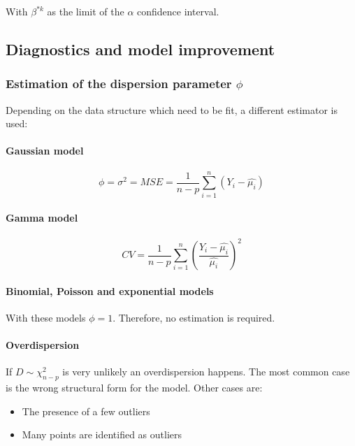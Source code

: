 With $\beta^{*k}$ as the limit of the $\alpha$ confidence interval.

\subsection{Diagnostics and model improvement}

\subsubsection{Estimation of the dispersion parameter $\phi$}

Depending on the data structure which need to be fit, a different estimator is used:

\paragraph{Gaussian model}
\begin{equation*}
\phi = \sigma^2 = MSE = \frac{1}{n-p}\sum_{i=1}^{n}(Y_i - \hat{\mu_i})
\end{equation*}

\paragraph{Gamma model}
\begin{equation*}
CV = \frac{1}{n-p}\sum_{i=1}^{n}\left(\frac{Y_i-\hat{\mu_i}}{\hat{\mu_i}}\right)^2
\end{equation*}

\paragraph{Binomial, Poisson and exponential models}
With these models $\phi = 1$. Therefore, no estimation is required.

\paragraph{Overdispersion}

If $D \sim \chi^2_{n-p}$ is very unlikely an overdispersion happens. The most common case is the wrong structural form for the model. Other cases are:
\begin{itemize}
	\tightlist
	\item The presence of a few outliers
	\item Many points are identified as outliers
\end{itemize}

